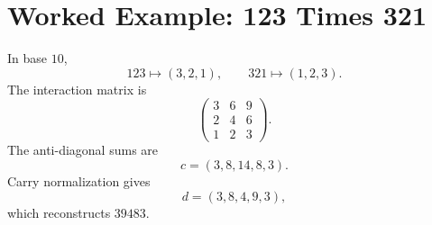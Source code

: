 \section{Worked Example: 123 Times 321}

In base $10$,
\[
  123 \mapsto (3,2,1), \qquad 321 \mapsto (1,2,3).
\]
The interaction matrix is
\[
\begin{pmatrix}
3 & 6 & 9\\
2 & 4 & 6\\
1 & 2 & 3
\end{pmatrix}.
\]
The anti-diagonal sums are
\[
  c = (3,8,14,8,3).
\]
Carry normalization gives
\[
  d = (3,8,4,9,3),
\]
which reconstructs $39483$.
